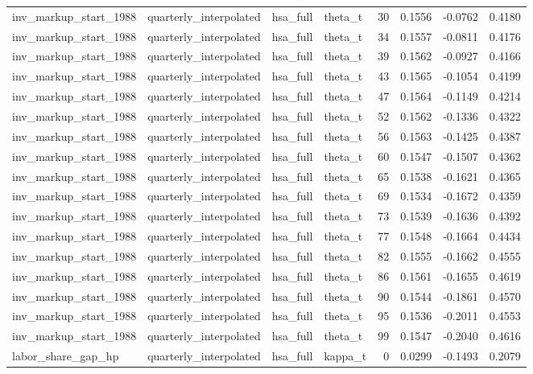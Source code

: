 \begin{tabular}{llllrrrr}
inv\_markup\_start\_1988 & quarterly\_interpolated & hsa\_full & theta\_t & 30 & 0.1556 & -0.0762 & 0.4180 \\
inv\_markup\_start\_1988 & quarterly\_interpolated & hsa\_full & theta\_t & 34 & 0.1557 & -0.0811 & 0.4176 \\
inv\_markup\_start\_1988 & quarterly\_interpolated & hsa\_full & theta\_t & 39 & 0.1562 & -0.0927 & 0.4166 \\
inv\_markup\_start\_1988 & quarterly\_interpolated & hsa\_full & theta\_t & 43 & 0.1565 & -0.1054 & 0.4199 \\
inv\_markup\_start\_1988 & quarterly\_interpolated & hsa\_full & theta\_t & 47 & 0.1564 & -0.1149 & 0.4214 \\
inv\_markup\_start\_1988 & quarterly\_interpolated & hsa\_full & theta\_t & 52 & 0.1562 & -0.1336 & 0.4322 \\
inv\_markup\_start\_1988 & quarterly\_interpolated & hsa\_full & theta\_t & 56 & 0.1563 & -0.1425 & 0.4387 \\
inv\_markup\_start\_1988 & quarterly\_interpolated & hsa\_full & theta\_t & 60 & 0.1547 & -0.1507 & 0.4362 \\
inv\_markup\_start\_1988 & quarterly\_interpolated & hsa\_full & theta\_t & 65 & 0.1538 & -0.1621 & 0.4365 \\
inv\_markup\_start\_1988 & quarterly\_interpolated & hsa\_full & theta\_t & 69 & 0.1534 & -0.1672 & 0.4359 \\
inv\_markup\_start\_1988 & quarterly\_interpolated & hsa\_full & theta\_t & 73 & 0.1539 & -0.1636 & 0.4392 \\
inv\_markup\_start\_1988 & quarterly\_interpolated & hsa\_full & theta\_t & 77 & 0.1548 & -0.1664 & 0.4434 \\
inv\_markup\_start\_1988 & quarterly\_interpolated & hsa\_full & theta\_t & 82 & 0.1555 & -0.1662 & 0.4555 \\
inv\_markup\_start\_1988 & quarterly\_interpolated & hsa\_full & theta\_t & 86 & 0.1561 & -0.1655 & 0.4619 \\
inv\_markup\_start\_1988 & quarterly\_interpolated & hsa\_full & theta\_t & 90 & 0.1544 & -0.1861 & 0.4570 \\
inv\_markup\_start\_1988 & quarterly\_interpolated & hsa\_full & theta\_t & 95 & 0.1536 & -0.2011 & 0.4553 \\
inv\_markup\_start\_1988 & quarterly\_interpolated & hsa\_full & theta\_t & 99 & 0.1547 & -0.2040 & 0.4616 \\
labor\_share\_gap\_hp & quarterly\_interpolated & hsa\_full & kappa\_t & 0 & 0.0299 & -0.1493 & 0.2079 \\

\end{tabular}
